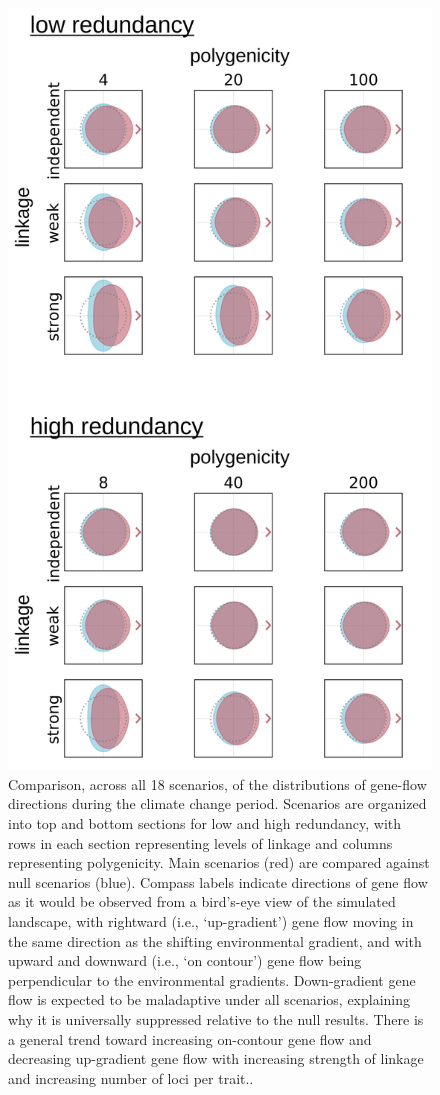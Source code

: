 \documentclass[9pt,twocolumn,twoside,lineno]{pnas-new}
\begin{document}
\begin{figure}
\centering
\includegraphics[width=.8\linewidth]{pub/figs/FIG_2_gene_flow.jpg}
    \caption{Comparison, across all 18 scenarios, of the distributions of gene-flow directions during the climate change period. Scenarios are organized into top and bottom sections for low and high redundancy, with rows in each section representing levels of linkage and columns representing polygenicity. Main scenarios (red) are compared against null scenarios (blue). Compass labels indicate directions of gene flow as it would be observed from a bird’s-eye view of the simulated landscape, with rightward (i.e., `up-gradient') gene flow moving in the same direction as the shifting environmental gradient, and with upward and downward (i.e., `on contour’) gene flow being perpendicular to the environmental gradients. Down-gradient gene flow is expected to be maladaptive under all scenarios, explaining why it is universally suppressed relative to the null results. There is a general trend toward increasing on-contour gene flow and decreasing up-gradient gene flow with increasing strength of linkage and increasing number of loci per trait..
}
\label{fig:fig_2}
\end{figure}
\end{document}
